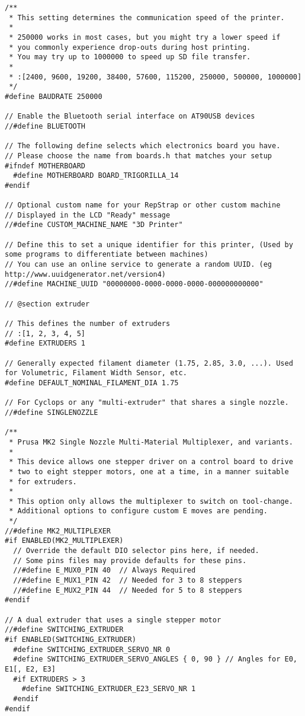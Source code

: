 \begin{lstlisting}
/**
 * This setting determines the communication speed of the printer.
 *
 * 250000 works in most cases, but you might try a lower speed if
 * you commonly experience drop-outs during host printing.
 * You may try up to 1000000 to speed up SD file transfer.
 *
 * :[2400, 9600, 19200, 38400, 57600, 115200, 250000, 500000, 1000000]
 */
#define BAUDRATE 250000

// Enable the Bluetooth serial interface on AT90USB devices
//#define BLUETOOTH

// The following define selects which electronics board you have.
// Please choose the name from boards.h that matches your setup
#ifndef MOTHERBOARD
  #define MOTHERBOARD BOARD_TRIGORILLA_14
#endif

// Optional custom name for your RepStrap or other custom machine
// Displayed in the LCD "Ready" message
//#define CUSTOM_MACHINE_NAME "3D Printer"

// Define this to set a unique identifier for this printer, (Used by some programs to differentiate between machines)
// You can use an online service to generate a random UUID. (eg http://www.uuidgenerator.net/version4)
//#define MACHINE_UUID "00000000-0000-0000-0000-000000000000"

// @section extruder

// This defines the number of extruders
// :[1, 2, 3, 4, 5]
#define EXTRUDERS 1

// Generally expected filament diameter (1.75, 2.85, 3.0, ...). Used for Volumetric, Filament Width Sensor, etc.
#define DEFAULT_NOMINAL_FILAMENT_DIA 1.75

// For Cyclops or any "multi-extruder" that shares a single nozzle.
//#define SINGLENOZZLE

/**
 * Prusa MK2 Single Nozzle Multi-Material Multiplexer, and variants.
 *
 * This device allows one stepper driver on a control board to drive
 * two to eight stepper motors, one at a time, in a manner suitable
 * for extruders.
 *
 * This option only allows the multiplexer to switch on tool-change.
 * Additional options to configure custom E moves are pending.
 */
//#define MK2_MULTIPLEXER
#if ENABLED(MK2_MULTIPLEXER)
  // Override the default DIO selector pins here, if needed.
  // Some pins files may provide defaults for these pins.
  //#define E_MUX0_PIN 40  // Always Required
  //#define E_MUX1_PIN 42  // Needed for 3 to 8 steppers
  //#define E_MUX2_PIN 44  // Needed for 5 to 8 steppers
#endif

// A dual extruder that uses a single stepper motor
//#define SWITCHING_EXTRUDER
#if ENABLED(SWITCHING_EXTRUDER)
  #define SWITCHING_EXTRUDER_SERVO_NR 0
  #define SWITCHING_EXTRUDER_SERVO_ANGLES { 0, 90 } // Angles for E0, E1[, E2, E3]
  #if EXTRUDERS > 3
    #define SWITCHING_EXTRUDER_E23_SERVO_NR 1
  #endif
#endif


\end{lstlisting}
